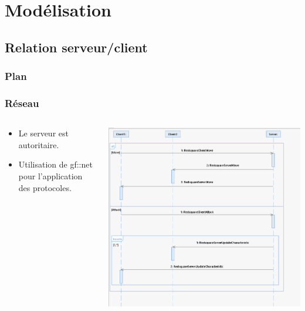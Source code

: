\documentclass[french]{beamer}
\begin{document}
\section{Modélisation}

\subsection{Relation serveur/client}

\begin{frame}
\frametitle{Plan}
\end{frame}

\begin{frame}
\frametitle{Réseau}
\begin{columns}
    \begin{column}{0.34\textwidth}
        \begin{itemize} 
            \item Le serveur est autoritaire. %
            \item Utilisation de gf::net pour l'application des protocoles.
        \end{itemize}
    \end{column}
    \begin{column}{0.66\textwidth}
        \includegraphics[scale=0.3]{./Diagramme/Deplacement}
    \end{column}
\end{columns}
\end{frame}
\end{document}
